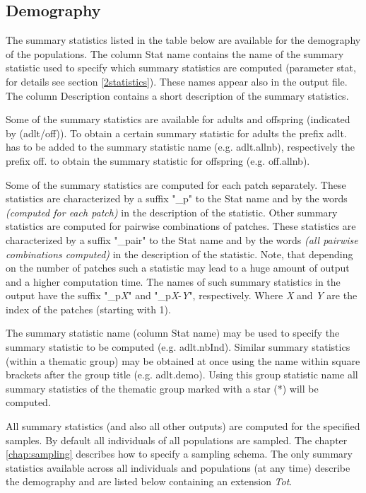 \documentclass[letterpaper,12pt,oneside]{book}
\begin{document}
\subsection{Demography}
The summary statistics listed in the table below are available for the demography of the populations. The column \textsf{Stat name} contains the name of the summary statistic used to specify which summary statistics are computed (parameter \textsf{stat}, for details see section \ref{2statistics}). These names appear also in the output file. The column \textsf{Description} contains a short description of the summary statistics. 

Some of the summary statistics are available for adults and offspring (indicated by \textsf{(adlt/off)}). To obtain a certain summary statistic for adults the prefix \textsf{adlt.} has to be added to the summary statistic name (e.g. \textsf{adlt.allnb}), respectively the prefix \textsf{off.} to obtain the summary statistic for offspring (e.g. \textsf{off.allnb}). 

Some of the summary statistics are computed for each patch separately. These statistics are characterized by a suffix "\_p" to the \textsf{Stat name} and by the words \textit{(computed for each patch)} in the description of the statistic. Other summary statistics are computed for pairwise combinations of patches. These statistics are characterized by a suffix "\_pair" to the \textsf{Stat name} and by the words \textit{(all pairwise combinations computed)} in the description of the statistic. Note, that depending on the number of patches such a statistic may lead to a huge amount of output and a higher computation time. The names of such summary statistics in the output have the suffix "\_p\textit{X}" and "\_p\textit{X}-\textit{Y}", respectively. Where \textit{X} and \textit{Y} are the index of the patches (starting with 1). 

The summary statistic name (column \textsf{Stat name}) may be used to specify the summary statistic to be computed (e.g. \textsf{adlt.nbInd}). Similar summary statistics (within a thematic group) may be obtained at once using the name within square brackets after the group title (e.g. \textsf{adlt.demo}). Using this group statistic name all summary statistics of the thematic group marked with a star (*) will be computed.

All summary statistics (and also all other outputs) are computed for the specified samples. By default all individuals of all populations are sampled. The chapter \ref{chap:sampling} describes how to specify a sampling schema. The only summary statistics available across all individuals and populations (at any time) describe the demography and are listed below containing an extension \textit{Tot}.   
\\
\\
\end{document}
